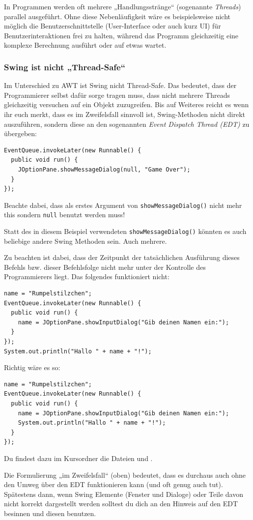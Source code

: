 In Programmen werden oft mehrere „Handlungsstränge“ (sogenannte \emph{Threads})
parallel ausgeführt. Ohne diese Nebenläufigkeit wäre es beispielsweise nicht
möglich die Benutzerschnittstelle (User-Interface oder auch kurz UI) für
Benutzerinteraktionen frei zu halten, während das Programm gleichzeitig eine
komplexe Berechnung ausführt oder auf etwas wartet.

\subsubsection{Swing ist nicht „Thread-Safe“}

Im Unterschied zu AWT ist Swing nicht Thread-Safe. Das bedeutet, dass der
Programmierer selbst dafür sorge tragen muss, dass nicht mehrere Threads
gleichzeitig versuchen auf ein Objekt zuzugreifen. Bis auf Weiteres reicht es
wenn ihr euch merkt, dass es im Zweifelsfall sinnvoll ist, Swing-Methoden nicht
direkt auszuführen, sondern diese an den sogenannten \emph{Event Dispatch Thread
(EDT)} zu übergeben:

\begin{lstlisting}
EventQueue.invokeLater(new Runnable() {
  public void run() {
    JOptionPane.showMessageDialog(null, "Game Over");
  }
});
\end{lstlisting}

Beachte dabei, dass als erstes Argument von \verb|showMessageDialog()| nicht
mehr this sondern \verb|null| benutzt werden muss!

Statt des in diesem Beispiel verwendeten \verb|showMessageDialog()| könnten es
auch beliebige andere Swing Methoden sein. Auch mehrere.

Zu beachten ist dabei, dass der Zeitpunkt der tatsächlichen Ausführung dieses
Befehls bzw. dieser Befehlsfolge nicht mehr unter der Kontrolle des
Programmierers liegt. Das folgendes funktioniert nicht:

\begin{lstlisting}
name = "Rumpelstilzchen";
EventQueue.invokeLater(new Runnable() {
  public void run() {
    name = JOptionPane.showInputDialog("Gib deinen Namen ein:");
  }
});
System.out.println("Hallo " + name + "!");
\end{lstlisting}

Richtig wäre es so:

\begin{lstlisting}
name = "Rumpelstilzchen";
EventQueue.invokeLater(new Runnable() {
  public void run() {
    name = JOptionPane.showInputDialog("Gib deinen Namen ein:");
    System.out.println("Hallo " + name + "!");
  }
});
\end{lstlisting}

Du findest dazu im Kursordner die Dateien  und
.

Die Formulierung „im Zweifelsfall“ (oben) bedeutet, dass es durchaus auch ohne
den Umweg über den EDT funktionieren kann (und oft genug auch tut). Spätestens
dann, wenn Swing Elemente (Fenster und Dialoge) oder Teile davon nicht korrekt
dargestellt werden solltest du dich an den Hinweis auf den EDT besinnen und
diesen benutzen.